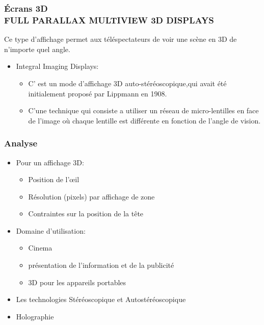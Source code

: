 \begin{frame}
	  \frametitle{Écrans 3D \\FULL PARALLAX MULTIVIEW 3D DISPLAYS} 
	 
Ce type d’affichage permet aux téléspectateurs de voir une scène en 3D de n'importe quel angle.\\
	
	\begin{itemize}
	\item Integral Imaging Displays:
								
\begin{itemize}
\item C’ est un mode d'affichage 3D auto-stéréoscopique,qui avait été initialement proposé par Lippmann en 1908.

\item C’une technique qui consiste a utiliser un réseau de micro-lentilles en face de l’image où chaque lentille est différente en fonction de l'angle de vision.

\end{itemize}
		\end{itemize}
		
	\end{frame}
	\begin{frame}
  \frametitle{Analyse} 
	
\begin{itemize}
\item Pour un affichage 3D:
\begin{itemize}
\item Position de l’œil
\item Résolution (pixels) par affichage de zone
\item Contraintes sur la position de la tête
\end{itemize}
\end{itemize}

\begin{itemize}
\item Domaine d’utilisation:
\begin{itemize}
\item Cinema
\item présentation de l'information et de la publicité
\item 3D pour les appareils portables
\end{itemize}
\end{itemize}
\begin{itemize}
\item Les technologies Stéréoscopique et Autostéréoscopique
\item Holographie
	\end{itemize}
\end{frame}


